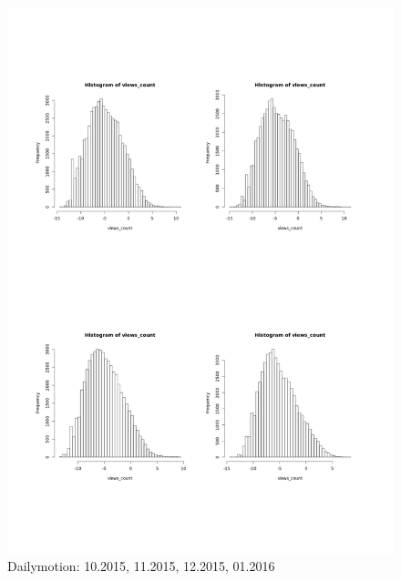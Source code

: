 \documentclass{article}
\begin{document}
\begin{figure}[H]
\caption{Dailymotion: 10.2015, 11.2015, 12.2015, 01.2016}
\centering
\includegraphics[scale=0.7]{dailymotionGauss}
\end{figure}
\end{document}
